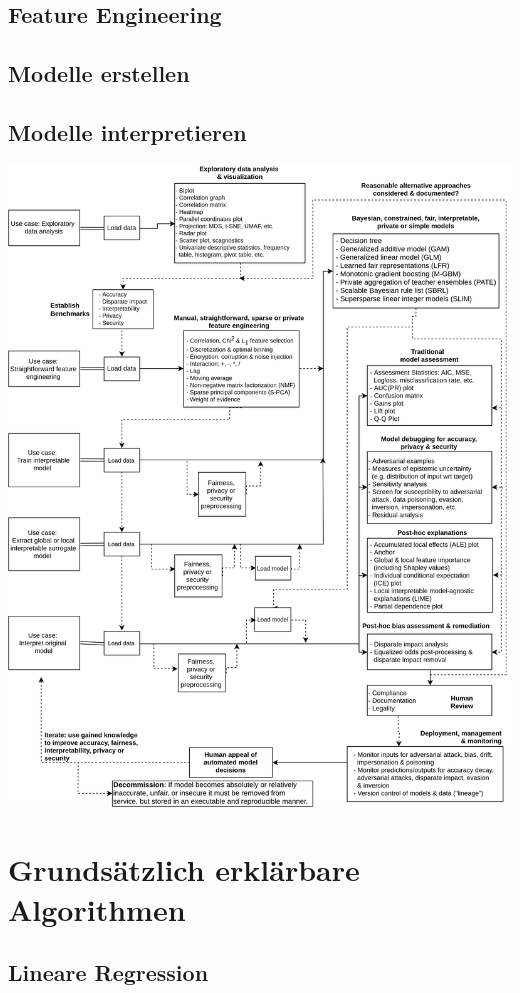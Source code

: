\documentclass[
  12pt, %
  a4paper, %
  oneside, %
  openany, 
  numbers=noenddot, %
  BCOR=5mm, %
  parskip=half*, %
  thesis, %
]{bfhbook}
\begin{document}
\subsection{Feature Engineering}
\subsection{Modelle erstellen}
\subsection{Modelle interpretieren}

\includegraphics[width=\textwidth]{Bilder/blueprint.png}

\section{Grundsätzlich erklärbare Algorithmen}
\subsection{Lineare Regression}
\end{document}
